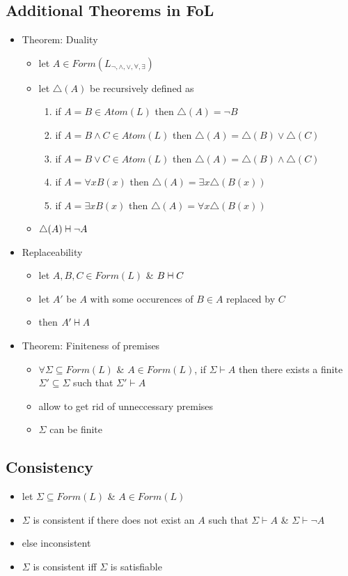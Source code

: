 \documentclass[11pt]{article}
\newcommand{\vdashv}{%
  \mathrel{%
    \text{%
      \ooalign{$\vdash$\cr\reflectbox{$\vdash$}\cr}%
    }%
  }%
}
\begin{document}
\subsection{Additional Theorems in FoL}
\begin{itemize}
    \item Theorem: Duality 
    \begin{itemize}
        \item let $A\in Form(L_{\neg,\land,\lor,\forall,\exists})$
        \item let $\triangle(A)$ be recursively defined as 
        \begin{enumerate}
            \item if $A=B\in Atom(L)$ then $\triangle(A) = \neg B$
            \item if $A=B\land C\in Atom(L)$ then $\triangle(A)=\triangle(B)\lor\triangle(C)$
            \item if $A=B\lor C\in Atom(L)$ then $\triangle(A)=\triangle(B)\land\triangle(C)$
            \item if $A=\forall xB(x)$ then $\triangle(A)=\exists x\triangle(B(x))$
            \item if $A=\exists xB(x)$ then $\triangle(A)=\forall x\triangle(B(x))$
        \end{enumerate}
        \item $\triangle(A)\vdashv\neg A$
    \end{itemize}
    \item Replaceability
    \begin{itemize}
        \item let $A,B,C\in Form(L)$ \& $B\vdashv C$
        \item let $A'$ be $A$ with some occurences of $B\in A$ replaced by $C$
        \item then $A'\vdashv A$
    \end{itemize}
    \item Theorem: Finiteness of premises
    \begin{itemize}
        \item $\forall\Sigma\subseteq Form(L)$ \& $A\in Form(L)$, if $\Sigma\vdash A$ then there exists a finite $\Sigma'\subseteq\Sigma$ such that $\Sigma'\vdash A$ 
        \item allow to get rid of unneccessary premises 
        \item $\Sigma$ can be finite 
    \end{itemize}
\end{itemize}
\subsection{Consistency}
\begin{itemize}
    \item let $\Sigma\subseteq Form(L)$ \& $A\in Form(L)$
    \item $\Sigma$ is consistent if there does not exist an $A$ such that $\Sigma\vdash A$ \& $\Sigma\vdash\neg A$
    \item else inconsistent 
    \item $\Sigma$ is consistent iff $\Sigma$ is satisfiable
\end{itemize}
\end{document}
